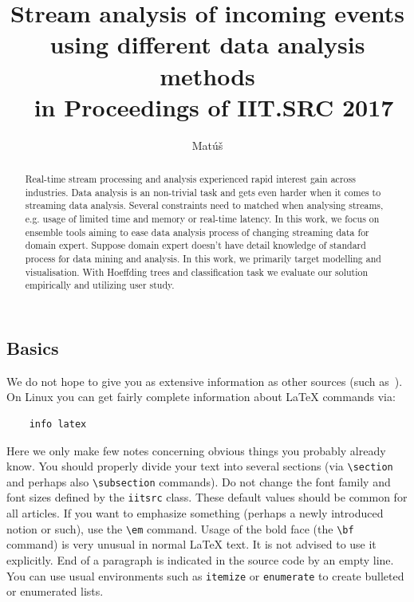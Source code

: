 \documentclass{iitsrc}
\title{Stream analysis of incoming events using different data analysis methods\\~in Proceedings of IIT.SRC 2017}
\author{Matúš}{Cimerman}
\begin{document}
\maketitle

\begin{multicols}{2}
\raggedcolumns

\begin{abstract}
Real-time stream processing and analysis experienced rapid interest gain across industries. Data analysis is an non-trivial task and gets even harder when it comes to streaming data analysis. Several constraints need to matched when analysing streams, e.g. usage of limited time and memory or real-time latency. In this work, we focus on ensemble tools aiming to ease data analysis process of changing streaming data for domain expert. Suppose domain expert doesn't have detail knowledge of standard process for data mining and analysis. In this work, we primarily target modelling and visualisation. With Hoeffding trees and classification task we evaluate our solution empirically and utilizing user study.
\end{abstract}

\section{Basics}
%
We do not hope to give you as extensive information as other sources (such
as~\cite{lamport:latex}). On Linux you can get fairly complete
information about \LaTeX{} commands via:
%
\begin{lstlisting}
    info latex
\end{lstlisting}
%
Here we only make few notes concerning obvious things you probably
already know.
%
You should properly divide your text into several sections (via
\verb|\section| and perhaps also \verb|\subsection| commands).
%
Do not change the font family and font sizes defined by the
\verb|iitsrc| class. These default values should be common for all
articles.
%
If you want to emphasize something (perhaps a newly introduced notion
or such), use the \verb|\em| command.
%
Usage of the bold face (the \verb|\bf| command) is very unusual in
normal \LaTeX{} text. It is not advised to use it explicitly.
%
End of a paragraph is indicated in the source code by an empty line.
%
You can use usual environments such as \verb|itemize| or
\verb|enumerate| to create bulleted or enumerated lists.
%

\end{multicols}
\end{document}

